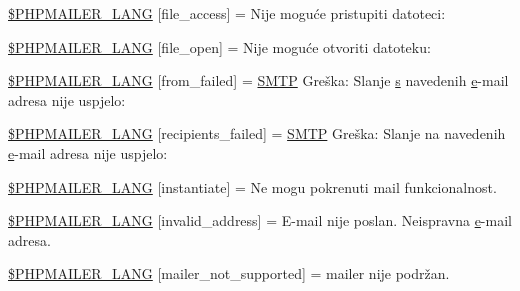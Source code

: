 \begin{DoxyCompactItemize}
\item 
\hyperlink{phpmailer_8lang-hr_8php_a7e83349023b856ef9e5c46e30ae6d51e}{\$\+P\+H\+P\+M\+A\+I\+L\+E\+R\+\_\+\+L\+A\+NG} \mbox{[}\textquotesingle{}file\+\_\+access\textquotesingle{}\mbox{]} = \textquotesingle{}Nije moguće pristupiti datoteci\+: \textquotesingle{}
\item 
\hyperlink{phpmailer_8lang-hr_8php_a28d1a6517bf4c942a0ddd506188ad2e0}{\$\+P\+H\+P\+M\+A\+I\+L\+E\+R\+\_\+\+L\+A\+NG} \mbox{[}\textquotesingle{}file\+\_\+open\textquotesingle{}\mbox{]} = \textquotesingle{}Nije moguće otvoriti datoteku\+: \textquotesingle{}
\item 
\hyperlink{phpmailer_8lang-hr_8php_adf832ae12155a09be077c6d5e4fd7e22}{\$\+P\+H\+P\+M\+A\+I\+L\+E\+R\+\_\+\+L\+A\+NG} \mbox{[}\textquotesingle{}from\+\_\+failed\textquotesingle{}\mbox{]} = \textquotesingle{}\hyperlink{class_s_m_t_p}{S\+M\+TP} Greška\+: Slanje \hyperlink{paste_2plugin_8min_8js_a43ae144ee2a4e493fea41ca42f795b14}{s} navedenih \hyperlink{jquery-ui_8min_8js_abea95a4e94bc6f4151d5683d4c12c3f4}{e}-\/mail adresa nije uspjelo\+: \textquotesingle{}
\item 
\hyperlink{phpmailer_8lang-hr_8php_a7589d30bb9b368327c2df015f3e6bcba}{\$\+P\+H\+P\+M\+A\+I\+L\+E\+R\+\_\+\+L\+A\+NG} \mbox{[}\textquotesingle{}recipients\+\_\+failed\textquotesingle{}\mbox{]} = \textquotesingle{}\hyperlink{class_s_m_t_p}{S\+M\+TP} Greška\+: Slanje na navedenih \hyperlink{jquery-ui_8min_8js_abea95a4e94bc6f4151d5683d4c12c3f4}{e}-\/mail adresa nije uspjelo\+: \textquotesingle{}
\item 
\hyperlink{phpmailer_8lang-hr_8php_ad58dde16780f4770ccf4dd282ea1f5ad}{\$\+P\+H\+P\+M\+A\+I\+L\+E\+R\+\_\+\+L\+A\+NG} \mbox{[}\textquotesingle{}instantiate\textquotesingle{}\mbox{]} = \textquotesingle{}Ne mogu pokrenuti mail funkcionalnost.\textquotesingle{}
\item 
\hyperlink{phpmailer_8lang-hr_8php_a42d61bcea4c79599ecb44fd062f54d47}{\$\+P\+H\+P\+M\+A\+I\+L\+E\+R\+\_\+\+L\+A\+NG} \mbox{[}\textquotesingle{}invalid\+\_\+address\textquotesingle{}\mbox{]} = \textquotesingle{}E-\/mail nije poslan. Neispravna \hyperlink{jquery-ui_8min_8js_abea95a4e94bc6f4151d5683d4c12c3f4}{e}-\/mail adresa.\textquotesingle{}
\item 
\hyperlink{phpmailer_8lang-hr_8php_aa2ebcb8833ee83a7ad67401c4bb3a6ad}{\$\+P\+H\+P\+M\+A\+I\+L\+E\+R\+\_\+\+L\+A\+NG} \mbox{[}\textquotesingle{}mailer\+\_\+not\+\_\+supported\textquotesingle{}\mbox{]} = \textquotesingle{} mailer nije podržan.\textquotesingle{}
\item 

\end{DoxyCompactItemize}
